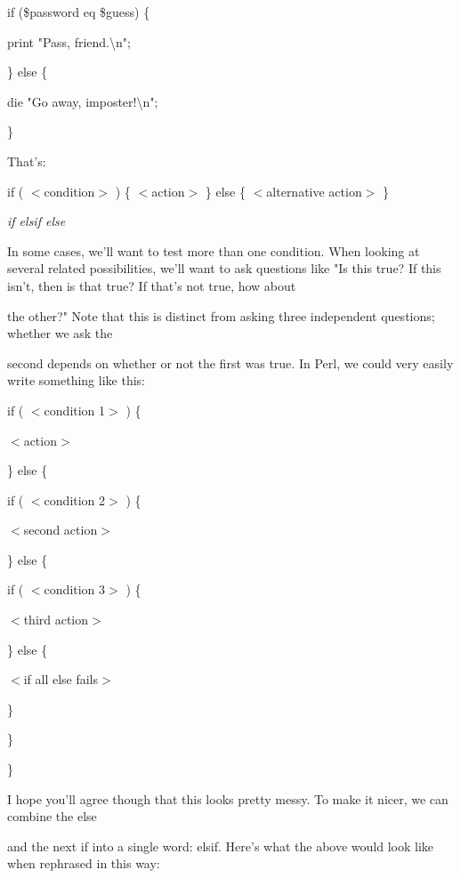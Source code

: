 \documentclass[a4paper,11pt]{book}
\begin{document}
\noindent 

\noindent if (\$password eq \$guess) \{

\noindent print "Pass, friend.\textbackslash n";

\noindent \} else \{

\noindent die "Go away, imposter!\textbackslash n";

\noindent \}

\noindent 

\noindent That's:

\noindent 

\noindent if ( $<$condition$>$ ) \{ $<$action$>$ \} else \{ $<$alternative action$>$ \}

\noindent 

\noindent \textit{if elsif else}

\noindent In some cases, we'll want to test more than one condition. When looking at several related possibilities, we'll want to ask questions like "Is this true? If this isn't, then is that true? If that's not true, how about

\noindent the other?" Note that this is distinct from asking three independent questions; whether we ask the

\noindent second depends on whether or not the first was true. In Perl, we could very easily write something like this:

\noindent 

\noindent if ( $<$condition 1$>$ ) \{

\noindent $<$action$>$

\noindent \} else \{

\noindent if ( $<$condition 2$>$ ) \{

\noindent $<$second action$>$

\noindent \} else \{

\noindent if ( $<$condition 3$>$ ) \{

\noindent $<$third action$>$

\noindent \} else \{

\noindent $<$if all else fails$>$

\noindent \}

\noindent \}

\noindent \}

\noindent 

\noindent I  hope you'll agree though that  this  looks  pretty  messy.  To  make  it  nicer,  we  can combine  the  else

\noindent and the next if into  a single word:  elsif.  Here's  what  the  above  would  look  like  when  rephrased  in this way:
\end{document}
